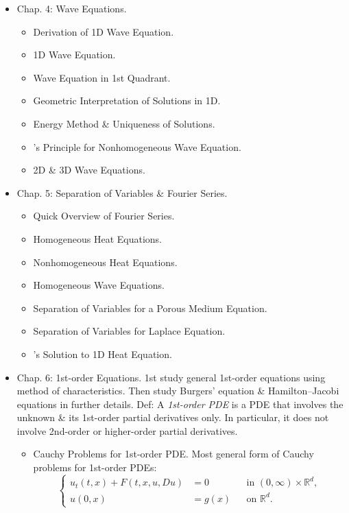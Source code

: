 \documentclass{article}
\begin{document}
\begin{enumerate}
\begin{itemize}
		\item {\sf Chap. 4: Wave Equations.}
		\begin{itemize}
			\item {\sf Derivation of 1D Wave Equation.}
			\item {\sf1D Wave Equation.}
			\item {\sf Wave Equation in 1st Quadrant.}
			\item {\sf Geometric Interpretation of Solutions in 1D.}
			\item {\sf Energy Method \& Uniqueness of Solutions.}
			\item {'s Principle for Nonhomogeneous Wave Equation.}
			\item {\sf2D \& 3D Wave Equations.}
		\end{itemize}
		\item {\sf Chap. 5: Separation of Variables \& Fourier Series.}
		\begin{itemize}
			\item {\sf Quick Overview of Fourier Series.}
			\item {\sf Homogeneous Heat Equations.}
			\item {\sf Nonhomogeneous Heat Equations.}
			\item {\sf Homogeneous Wave Equations.}
			\item {\sf Separation of Variables for a Porous Medium Equation.}
			\item {\sf Separation of Variables for Laplace Equation.}
			\item {'s Solution to 1D Heat Equation.}
		\end{itemize}
		\item {\sf Chap. 6: 1st-order Equations.} 1st study general 1st-order equations using method of characteristics. Then study Burgers' equation \& Hamilton--Jacobi equations in further details. Def: A \emph{1st-order PDE} is a PDE that involves the unknown \& its 1st-order partial derivatives only. In particular, it does not involve 2nd-order or higher-order partial derivatives.
		\begin{itemize}
			\item {\sf Cauchy Problems for 1st-order PDE.} Most general form of Cauchy problems for 1st-order PDEs:
			\begin{equation*}
				\left\{\begin{split}
					u_t(t,x) + F(t,x,u,Du) &= 0&&\mbox{in }(0,\infty)\times\mathbb{R}^d,\\
					u(0,x) &= g(x)&&\mbox{on }\mathbb{R}^d.

\end{split}
\end{equation*}
\end{itemize}
\end{itemize}
\end{enumerate}
\end{document}
